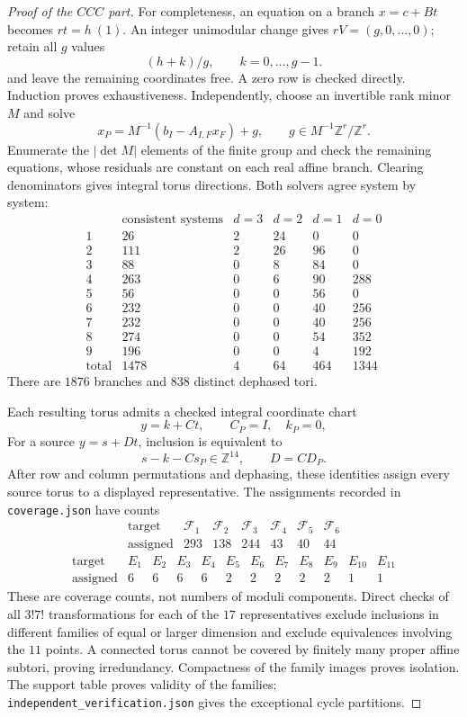 \documentclass[11pt,a4paper]{article}
\theoremstyle{plain}
\theoremstyle{definition}
\numberwithin{equation}{section}
\begin{document}
\begin{proof}[Proof of the $CCC$ part]
For completeness, an equation on a branch $x=c+Bt$ becomes $rt=h\ (1)$. An integer unimodular change gives $rV=(g,0,\ldots,0)$; retain all $g$ values
$$(h+k)/g,\qquad k=0,\ldots,g-1.$$
and leave the remaining coordinates free. A zero row is checked directly. Induction proves exhaustiveness. Independently, choose an invertible rank minor $M$ and solve
$$
 x_P=M^{-1}(b_I-A_{I,F}x_F)+g,\qquad
 g\in M^{-1}\mathbb{Z}^r/\mathbb{Z}^r.
$$
Enumerate the $|\det M|$ elements of the finite group and check the remaining equations, whose residuals are constant on each real affine branch. Clearing denominators gives integral torus directions. Both solvers agree system by system:
$$
\begin{array}{c|r|rrrr}
 &\text{consistent systems}&d=3&d=2&d=1&d=0\\ \hline
1&26&2&24&0&0\\
2&111&2&26&96&0\\
3&88&0&8&84&0\\
4&263&0&6&90&288\\
5&56&0&0&56&0\\
6&232&0&0&40&256\\
7&232&0&0&40&256\\
8&274&0&0&54&352\\
9&196&0&0&4&192\\ \hline
\text{total}&1478&4&64&464&1344
\end{array}
$$
There are $1876$ branches and $838$ distinct dephased tori.

\label{ccc:s:coverage}
Each resulting torus admits a checked integral coordinate chart
$$y=k+Ct,\qquad C_P=I,\quad k_P=0,$$
For a source $y=s+Dt$, inclusion is equivalent to
\begin{equation}\label{ccc:coverage-identities}
 s-k-Cs_P\in\mathbb{Z}^{14},
 \qquad D=CD_P.
\end{equation}
After row and column permutations and dephasing, these identities assign every source torus to a displayed representative. The assignments recorded in \texttt{coverage.json} have counts
$$
\begin{array}{c|rrrrrr}
\text{target}&\mathcal F_1&\mathcal F_2&\mathcal F_3&\mathcal F_4&\mathcal F_5&\mathcal F_6\\ \hline
\text{assigned}&293&138&244&43&40&44
\end{array}
$$
$$
\begin{array}{c|rrrrrrrrrrr}
\text{target}&E_1&E_2&E_3&E_4&E_5&E_6&E_7&E_8&E_9&E_{10}&E_{11}\\ \hline
\text{assigned}&6&6&6&6&2&2&2&2&2&1&1
\end{array}
$$
These are coverage counts, not numbers of moduli components. Direct checks of all $3!7!$ transformations for each of the $17$ representatives exclude inclusions in different families of equal or larger dimension and exclude equivalences involving the $11$ points. A connected torus cannot be covered by finitely many proper affine subtori, proving irredundancy. Compactness of the family images proves isolation. The support table proves validity of the families; \texttt{independent\_verification.json} gives the exceptional cycle partitions.
\end{proof}
\end{document}
